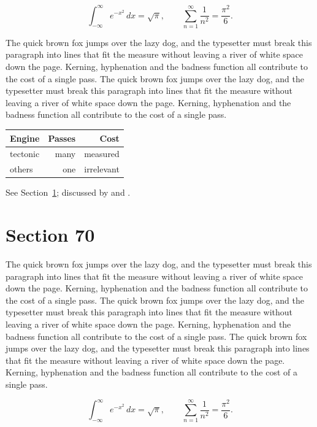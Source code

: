 \documentclass{article}
\begin{document}
\begin{equation}\label{eq:69}
\int_{-\infty}^{\infty} e^{-x^{2}}\,dx = \sqrt{\pi}, \qquad
\sum_{n=1}^{\infty} \frac{1}{n^{2}} = \frac{\pi^{2}}{6}.
\end{equation}

The quick brown fox jumps over the lazy dog, and the typesetter must break this paragraph into lines that fit the measure without leaving a river of white space down the page. Kerning, hyphenation and the badness function all contribute to the cost of a single pass. The quick brown fox jumps over the lazy dog, and the typesetter must break this paragraph into lines that fit the measure without leaving a river of white space down the page. Kerning, hyphenation and the badness function all contribute to the cost of a single pass. 

\begin{center}
\begin{tabular}{lrr}
\toprule
Engine & Passes & Cost \\
\midrule
tectonic & many & measured \\
others & one & irrelevant \\
\bottomrule
\end{tabular}
\end{center}

See Section~\ref{sec:70}; discussed by \textcite{k5} and \textcite{l2}.
\section{Section 70}
\label{sec:70}
The quick brown fox jumps over the lazy dog, and the typesetter must break this paragraph into lines that fit the measure without leaving a river of white space down the page. Kerning, hyphenation and the badness function all contribute to the cost of a single pass. The quick brown fox jumps over the lazy dog, and the typesetter must break this paragraph into lines that fit the measure without leaving a river of white space down the page. Kerning, hyphenation and the badness function all contribute to the cost of a single pass. The quick brown fox jumps over the lazy dog, and the typesetter must break this paragraph into lines that fit the measure without leaving a river of white space down the page. Kerning, hyphenation and the badness function all contribute to the cost of a single pass. 

\begin{equation}\label{eq:70}
\int_{-\infty}^{\infty} e^{-x^{2}}\,dx = \sqrt{\pi}, \qquad
\sum_{n=1}^{\infty} \frac{1}{n^{2}} = \frac{\pi^{2}}{6}.
\end{equation}
\end{document}
